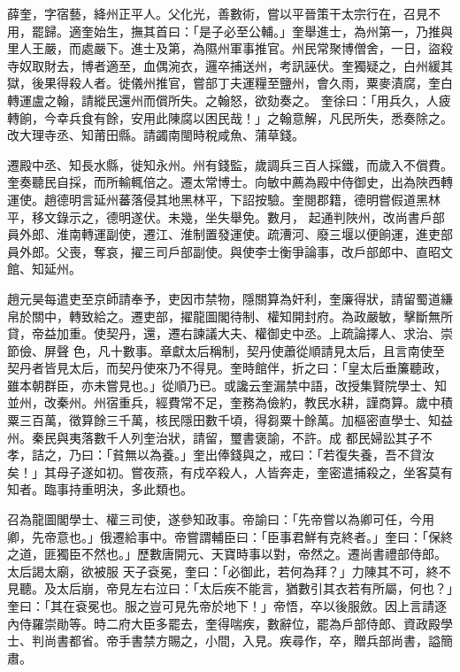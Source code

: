 \begin{pinyinscope}
 薛奎，字宿藝，絳州正平人。父化光，善數術，嘗以平晉策干太宗行在，召見不用，罷歸。適奎始生，撫其首曰：「是子必至公輔。」奎舉進士，為州第一，乃推與里人王嚴，而處嚴下。進士及第，為隰州軍事推官。州民常聚博僧舍，一日，盜殺寺奴取財去，博者適至，血偶涴衣，邏卒捕送州，考訊誣伏。奎獨疑之，白州緩其獄，後果得殺人者。徙儀州推官，嘗部丁夫運糧至鹽州，會久雨，粟麥漬腐，奎白轉運盧之翰，請縱民還州而償所失。之翰怒，欲劾奏之。
 奎徐曰：「用兵久，人疲轉餉，今幸兵食有餘，安用此陳腐以困民哉！」之翰意解，凡民所失，悉奏除之。改大理寺丞、知莆田縣。請蠲南閩時稅咸魚、蒲草錢。



 遷殿中丞、知長水縣，徙知永州。州有錢監，歲調兵三百人採鐵，而歲入不償費。奎奏聽民自採，而所輸輒倍之。遷太常博士。向敏中薦為殿中侍御史，出為陜西轉運使。趙德明言延州蕃落侵其地黑林平，下詔按驗。奎閱郡籍，德明嘗假道黑林平，移文錄示之，德明遂伏。未幾，坐失舉免。數月，
 起通判陜州，改尚書戶部員外郎、淮南轉運副使，遷江、淮制置發運使。疏漕河、廢三堰以便餉運，進吏部員外郎。父喪，奪哀，擢三司戶部副使。與使李士衡爭論事，改戶部郎中、直昭文館、知延州。



 趙元昊每遣吏至京師請奉予，吏因市禁物，隱關算為奸利，奎廉得狀，請留蜀道縑帛於關中，轉致給之。遷吏部，擢龍圖閣待制、權知開封府。為政嚴敏，擊斷無所貸，帝益加重。使契丹，還，遷右諫議大夫、權御史中丞。上疏論擇人、求治、崇節儉、屏聲
 色，凡十數事。章獻太后稱制，契丹使蕭從順請見太后，且言南使至契丹者皆見太后，而契丹使來乃不得見。奎時館伴，折之曰：「皇太后垂簾聽政，雖本朝群臣，亦未嘗見也。」從順乃已。或讒云奎漏禁中語，改授集賢院學士、知並州，改秦州。州宿重兵，經費常不足，奎務為儉約，教民水耕，謹商算。歲中積粟三百萬，徵算餘三千萬，核民隱田數千頃，得芻粟十餘萬。加樞密直學士、知益州。秦民與夷落數千人列奎治狀，請留，璽書褒諭，不許。成
 都民婦訟其子不孝，詰之，乃曰：「貧無以為養。」奎出俸錢與之，戒曰：「若復失養，吾不貸汝矣！」其母子遂如初。嘗夜燕，有戍卒殺人，人皆奔走，奎密遣捕殺之，坐客莫有知者。臨事持重明決，多此類也。



 召為龍圖閣學士、權三司使，遂參知政事。帝諭曰：「先帝嘗以為卿可任，今用卿，先帝意也。」俄遷給事中。帝嘗謂輔臣曰：「臣事君鮮有克終者。」奎曰：「保終之道，匪獨臣不然也。」歷數唐開元、天寶時事以對，帝然之。遷尚書禮部侍郎。太后謁太廟，欲被服
 天子袞冕，奎曰：「必御此，若何為拜？」力陳其不可，終不見聽。及太后崩，帝見左右泣曰：「太后疾不能言，猶數引其衣若有所屬，何也？」奎曰：「其在袞冕也。服之豈可見先帝於地下！」帝悟，卒以後服斂。因上言請逐內侍羅崇勛等。時二府大臣多罷去，奎得喘疾，數辭位，罷為戶部侍郎、資政殿學士、判尚書都省。帝手書禁方賜之，小間，入見。疾尋作，卒，贈兵部尚書，謚簡肅。




\end{pinyinscope}
